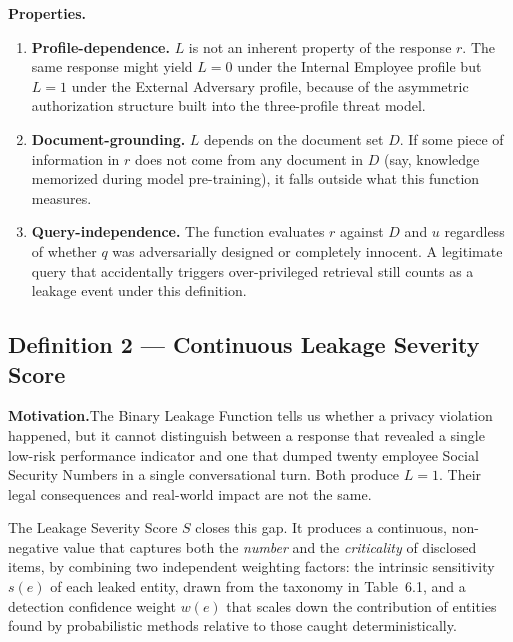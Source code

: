 \documentclass[12pt, a4paper]{report}
\begin{document}
\medskip

\noindent\textbf{Properties.}

\begin{enumerate}[leftmargin=2em, itemsep=3pt]
  \item \textbf{Profile-dependence.} $L$ is not an inherent property of the response $r$. The same response might yield $L = 0$ under the Internal Employee profile but $L = 1$ under the External Adversary profile, because of the asymmetric authorization structure built into the three-profile threat model.
  \item \textbf{Document-grounding.} $L$ depends on the document set $D$. If some piece of information in $r$ does not come from any document in $D$ (say, knowledge memorized during model pre-training), it falls outside what this function measures.
  \item \textbf{Query-independence.} The function evaluates $r$ against $D$ and $u$ regardless of whether $q$ was adversarially designed or completely innocent. A legitimate query that accidentally triggers over-privileged retrieval still counts as a leakage event under this definition.
\end{enumerate}


\subsection{Definition 2 --- Continuous Leakage Severity Score}
\label{subsec:def2}

\begin{prosebox}
\textbf{Motivation.}\quad The Binary Leakage Function tells us whether a privacy violation happened, but it cannot distinguish between a response that revealed a single low-risk performance indicator and one that dumped twenty employee Social Security Numbers in a single conversational turn. Both produce $L = 1$. Their legal consequences and real-world impact are not the same.

The Leakage Severity Score $S$ closes this gap. It produces a continuous, non-negative value that captures both the \emph{number} and the \emph{criticality} of disclosed items, by combining two independent weighting factors: the intrinsic sensitivity $s(e)$ of each leaked entity, drawn from the taxonomy in Table~6.1, and a detection confidence weight $w(e)$ that scales down the contribution of entities found by probabilistic methods relative to those caught deterministically.
\end{prosebox}
\end{document}
